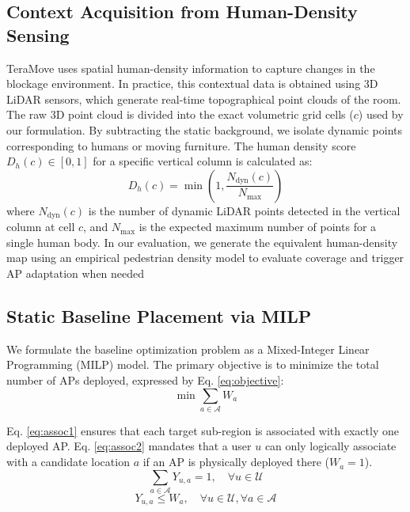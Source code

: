 \documentclass[conference]{IEEEtran}
\begin{document}
\subsection{Context Acquisition from Human-Density Sensing}

	TeraMove uses spatial human-density information to capture changes in the blockage environment. In practice, this contextual data is obtained using 3D LiDAR sensors, which generate real-time topographical point clouds of the room. The raw 3D point cloud is divided into the exact volumetric grid cells ($c$) used by our formulation. By subtracting the static background, we isolate dynamic points corresponding to humans or moving furniture. The human density score $D_h(c) \in [0,1]$ for a specific vertical column is calculated as:
	\begin{equation}
		D_h(c) = \min \left(1, \frac{N_{\text{dyn}}(c)}{N_{\text{max}}} \right)
	\end{equation}
	where $N_{\text{dyn}}(c)$ is the number of dynamic LiDAR points detected in the vertical column at cell $c$, and $N_{\text{max}}$ is the expected maximum number of points for a single human body. In our evaluation, we generate the equivalent human-density map using an empirical pedestrian density model to evaluate coverage and trigger AP adaptation when needed



\subsection{Static Baseline Placement via MILP}

We formulate the baseline optimization problem as a Mixed-Integer Linear Programming (MILP) model. The primary objective is to minimize the total number of APs deployed, expressed by Eq. \eqref{eq:objective}:
\begin{equation}
    \min \sum_{a \in \mathcal{A}} W_a
    \label{eq:objective}
\end{equation}

Eq. \eqref{eq:assoc1} ensures that each target sub-region is associated with exactly one deployed AP. Eq. \eqref{eq:assoc2} mandates that a user $u$ can only logically associate with a candidate location $a$ if an AP is physically deployed there ($W_a = 1$).
\begin{equation}
    \sum_{a \in \mathcal{A}} Y_{u,a} = 1, \quad \forall u \in \mathcal{U}
    \label{eq:assoc1}
\end{equation}
\begin{equation}
    Y_{u,a} \le W_a, \quad \forall u \in \mathcal{U}, \forall a \in \mathcal{A}
    \label{eq:assoc2}
\end{equation}
\end{document}
